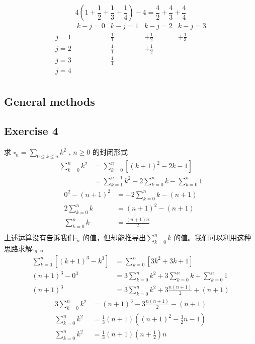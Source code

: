 \documentclass[mode=geye]{elegantnote}
\begin{document}
\begin{equation*}
    4\left(1+\frac{1}{2}+\frac{1}{3}+\frac{1}{4}\right)-4 = \frac{4}{2}+\frac{4}{3}+\frac{4}{4}
\end{equation*}
\begin{equation*}
    \begin{array}{ccccc}
            & k-j=0   & k-j=1   & k-j=2   & k-j=3   \\
        j=1 & & \frac{1}{1} & +\frac{1}{2} & +\frac{1}{3} \\
        j=2 & & \frac{1}{1} & +\frac{1}{2} &              \\
        j=3 & & \frac{1}{1} &              &              \\
        j=4 & &             &              &              \\
    \end{array}
\end{equation*}

\subsection{General methods}
\subsection{Exercise 4}
求 $ \square_n = \sum_{0\leqslant k \leqslant n}k^2 $ , $ n\geqslant 0 $ 的封闭形式
\begin{align*}
    \sum_{k=0}^{n}k^2 
    &= \sum_{k=0}^{n}[(k+1)^2-2k-1] \\
    &= \sum_{k=1}^{n+1}k^2 - 2 \sum_{k=0}^{n}k - \sum_{k=0}^{n}1
\end{align*}
\begin{align*}
    0^2-(n+1)^2 &= -2 \sum_{k=0}^{n}k - (n+1) \\
    2\sum_{k=0}^{n} k &= (n+1)^2 - (n+1)\\
    \sum_{k=0}^{n} k &= \frac{(n+1)n}{2}\\
\end{align*}
上述运算没有告诉我们$ \square_n $ 的值，但却能推导出$ \sum_{k=0}^{n}k $ 的值。我们可以利用这种思路求解$ \square_n $ 。
\begin{align*}
    \sum_{k=0}^{n}\left[(k+1)^3-k^3\right] &= \sum_{k=0}^{n}\left[ 3k^2+3k+1 \right] \\
    (n+1)^3 - 0^3 &= 3 \sum_{k=0}^{n}k^2 + 3 \sum_{k=0}^{n}k +  \sum_{k=0}^{n}1 \\
    (n+1)^3 &= 3 \sum_{k=0}^{n}k^2 + 3 \frac{n(n+1)}{2} + (n+1)
\end{align*}
\begin{align*}
    3\sum_{k=0}^{n}k^2 &= (n+1)^3 - 3\frac{n(n+1)}{2}-(n+1) \\
    \sum_{k=0}^{n}k^2 &= \frac{1}{3}(n+1)\left((n+1)^2-\frac{3}{2}n-1\right)\\
    \sum_{k=0}^{n}k^2 &= \frac{1}{3}(n+1)(n+\frac{1}{2})n
\end{align*}
\end{document}
